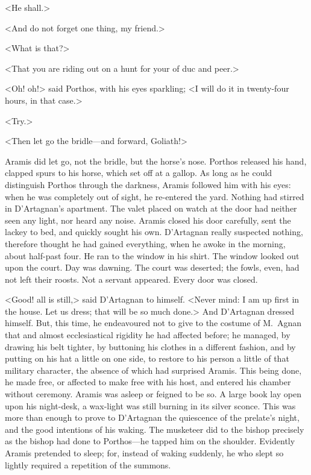 <He shall.>

<And do not forget one thing, my friend.>

<What is that?>

<That you are riding out on a hunt for your  of duc and peer.>

<Oh! oh!> said Porthos, with his eyes sparkling; <I will do it in twenty-four hours, in that case.>

<Try.>

<Then let go the bridle—and forward, Goliath!>

Aramis did let go, not the bridle, but the horse's nose. Porthos released his hand, clapped spurs to his horse, which set off at a gallop. As long as he could distinguish Porthos through the darkness, Aramis followed him with his eyes: when he was completely out of sight, he re-entered the yard. Nothing had stirred in D'Artagnan's apartment. The valet placed on watch at the door had neither seen any light, nor heard any noise. Aramis closed his door carefully, sent the lackey to bed, and quickly sought his own. D'Artagnan really suspected nothing, therefore thought he had gained everything, when he awoke in the morning, about half-past four. He ran to the window in his shirt. The window looked out upon the court. Day was dawning. The court was deserted; the fowls, even, had not left their roosts. Not a servant appeared. Every door was closed.

<Good! all is still,> said D'Artagnan to himself. <Never mind: I am up first in the house. Let us dress; that will be so much done.> And D'Artagnan dressed himself. But, this time, he endeavoured not to give to the costume of M.~Agnan that  and almost ecclesiastical rigidity he had affected before; he managed, by drawing his belt tighter, by buttoning his clothes in a different fashion, and by putting on his hat a little on one side, to restore to his person a little of that military character, the absence of which had surprised Aramis. This being done, he made free, or affected to make free with his host, and entered his chamber without ceremony. Aramis was asleep or feigned to be so. A large book lay open upon his night-desk, a wax-light was still burning in its silver sconce. This was more than enough to prove to D'Artagnan the quiescence of the prelate's night, and the good intentions of his waking. The musketeer did to the bishop precisely as the bishop had done to Porthos—he tapped him on the shoulder. Evidently Aramis pretended to sleep; for, instead of waking suddenly, he who slept so lightly required a repetition of the summons.

